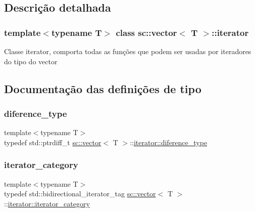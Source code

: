 \subsection{Descrição detalhada}
\subsubsection*{template$<$typename T$>$\newline
class sc\+::vector$<$ T $>$\+::iterator}

Classe iterator, comporta todas as funções que podem ser usadas por iteradores do tipo do vector 

\subsection{Documentação das definições de tipo}
\mbox{\label{classsc_1_1vector_1_1iterator_ac395bf1f0c48b965628b90211223d18f}} 
\subsubsection{\texorpdfstring{diference\+\_\+type}{diference\_type}}
{\footnotesize\ttfamily template$<$typename T$>$ \\
typedef std\+::ptrdiff\+\_\+t \mbox{\hyperlink{classsc_1_1vector}{sc\+::vector}}$<$ T $>$\+::\mbox{\hyperlink{classsc_1_1vector_1_1iterator_ac395bf1f0c48b965628b90211223d18f}{iterator\+::diference\+\_\+type}}}

\mbox{\label{classsc_1_1vector_1_1iterator_ac49f578e5b98fd9e58b3d7e13b5d5b53}} 
\subsubsection{\texorpdfstring{iterator\+\_\+category}{iterator\_category}}
{\footnotesize\ttfamily template$<$typename T$>$ \\
typedef std\+::bidirectional\+\_\+iterator\+\_\+tag \mbox{\hyperlink{classsc_1_1vector}{sc\+::vector}}$<$ T $>$\+::\mbox{\hyperlink{classsc_1_1vector_1_1iterator_ac49f578e5b98fd9e58b3d7e13b5d5b53}{iterator\+::iterator\+\_\+category}}}

